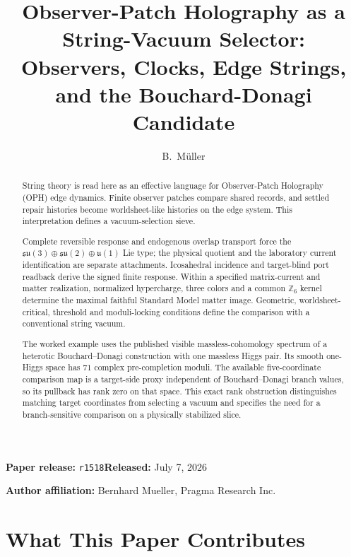 \documentclass[11pt]{article}
\title{Observer-Patch Holography as a String-Vacuum Selector:\\
Observers, Clocks, Edge Strings, and the Bouchard-Donagi Candidate}
\author{B.\ M\"uller}
\date{\OPHPaperReleaseDate}
\newcommand{\OPHPaperReleaseID}{r1518}%
\newcommand{\OPHPaperReleaseDate}{July 7, 2026}%
\newcommand{\OPHPaperReleaseBanner}{%
        \begin{center}
        \small\textbf{Paper release:} \texttt{\OPHPaperReleaseID}\quad\textbf{Released:} \OPHPaperReleaseDate
        \end{center}}
\theoremstyle{remark}
\theoremstyle{plain}
\begin{document}
\maketitle
\OPHPaperReleaseBanner

\begin{center}
\small\textbf{Author affiliation:} Bernhard Mueller, Pragma Research Inc.
\end{center}

\begin{abstract}
String theory is read here as an effective language for Observer-Patch
Holography (OPH) edge dynamics. Finite observer patches compare shared records,
and settled repair histories become worldsheet-like histories on the edge
system. This interpretation defines a vacuum-selection sieve.

Complete reversible response and endogenous overlap transport force the
\(\mathfrak{su}(3)\oplus\mathfrak{su}(2)\oplus\mathfrak u(1)\) Lie type; the
physical quotient and the laboratory current identification are separate
attachments.
Icosahedral incidence and target-blind port readback derive the signed finite
response. Within a specified matrix-current and matter realization, normalized
hypercharge, three colors and a common \(\mathbb Z_6\) kernel determine the
maximal faithful Standard Model matter image. Geometric, worldsheet-critical,
threshold and moduli-locking conditions define the comparison with a
conventional string vacuum.

The worked example uses the published visible massless-cohomology spectrum of
a heterotic Bouchard--Donagi construction with one massless Higgs pair. Its
smooth one-Higgs space has \(71\) complex pre-completion moduli. The available
five-coordinate comparison map is a target-side proxy independent of
Bouchard--Donagi branch values, so its pullback has rank zero on that space.
This exact rank obstruction distinguishes matching target coordinates from
selecting a vacuum and specifies the need for a branch-sensitive comparison
on a physically stabilized slice.
\end{abstract}

\section*{What This Paper Contributes}
\end{document}

